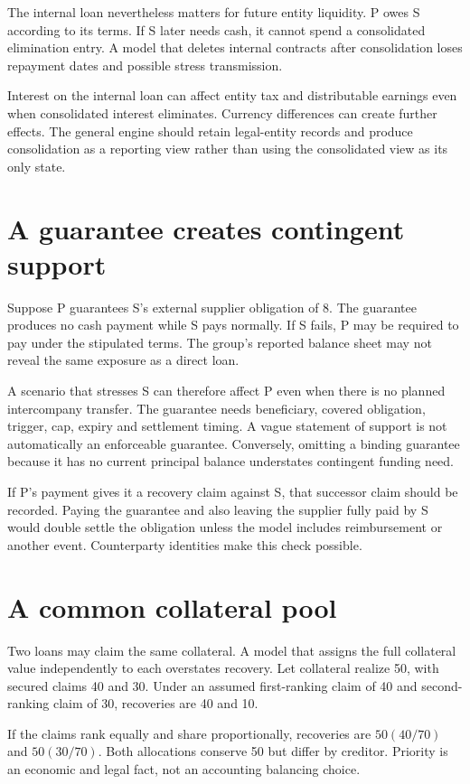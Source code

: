 The internal loan nevertheless matters for future entity liquidity. P owes S according to its terms. If S later needs cash, it cannot spend a consolidated elimination entry. A model that deletes internal contracts after consolidation loses repayment dates and possible stress transmission.

Interest on the internal loan can affect entity tax and distributable earnings even when consolidated interest eliminates. Currency differences can create further effects. The general engine should retain legal-entity records and produce consolidation as a reporting view rather than using the consolidated view as its only state.

\section{A guarantee creates contingent support}
Suppose P guarantees S's external supplier obligation of 8. The guarantee produces no cash payment while S pays normally. If S fails, P may be required to pay under the stipulated terms. The group's reported balance sheet may not reveal the same exposure as a direct loan.

A scenario that stresses S can therefore affect P even when there is no planned intercompany transfer. The guarantee needs beneficiary, covered obligation, trigger, cap, expiry and settlement timing. A vague statement of support is not automatically an enforceable guarantee. Conversely, omitting a binding guarantee because it has no current principal balance understates contingent funding need.

If P's payment gives it a recovery claim against S, that successor claim should be recorded. Paying the guarantee and also leaving the supplier fully paid by S would double settle the obligation unless the model includes reimbursement or another event. Counterparty identities make this check possible.

\section{A common collateral pool}
Two loans may claim the same collateral. A model that assigns the full collateral value independently to each overstates recovery. Let collateral realize 50, with secured claims 40 and 30. Under an assumed first-ranking claim of 40 and second-ranking claim of 30, recoveries are 40 and 10.

If the claims rank equally and share proportionally, recoveries are $50(40/70)$ and $50(30/70)$. Both allocations conserve 50 but differ by creditor. Priority is an economic and legal fact, not an accounting balancing choice.

